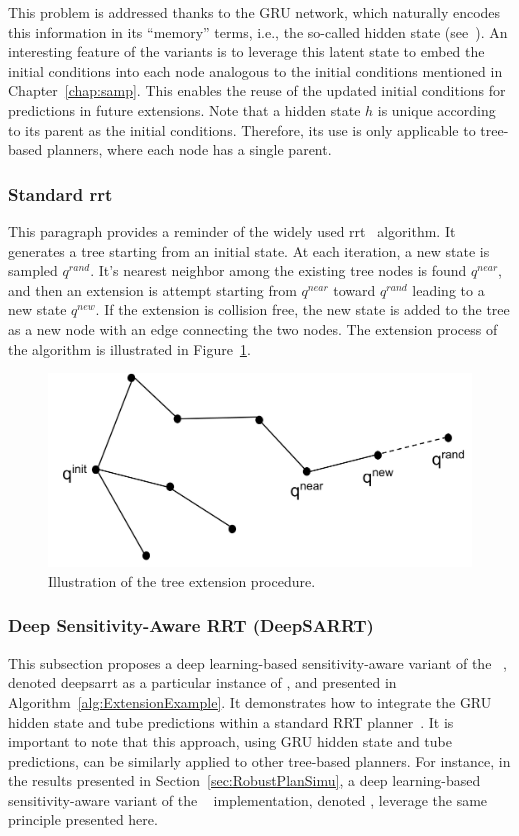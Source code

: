 This problem is addressed thanks to the GRU network, which naturally encodes this information in its ``memory'' terms, i.e., the so-called hidden state (see~\cite{cGRU}).
An interesting feature of the  variants is to leverage this latent state to embed the initial conditions into each node analogous to the  initial conditions mentioned in Chapter~\ref{chap:samp}. 
This enables the reuse of the updated initial conditions for predictions in future extensions.
Note that a hidden state $h$ is unique according to its parent as the  initial conditions.
Therefore, its use is only applicable to tree-based planners, where each node has a single parent.

\subsubsection{Standard \gls{rrt}}

This paragraph provides a reminder of the widely used \gls{rrt}~\cite{cRRT} algorithm.
It generates a tree starting from an initial state.
At each iteration, a new state is sampled $q^{rand}$.
It's nearest neighbor among the existing tree nodes is found $q^{near}$, and then an extension is attempt starting from $q^{near}$ toward $q^{rand}$ leading to a new state $q^{new}$.
If the extension is collision free, the new state is added to the tree as a new node with an edge connecting the two nodes.
The extension process of the algorithm is illustrated in Figure~\ref{fig:rrt}.

\begin{figure} [htp]
    \centering
    \includegraphics[width=0.6\linewidth]{figures/models/rrt.png} 
    \caption{Illustration of the  tree extension procedure.}%
    \label{fig:rrt}%
\end{figure}

\subsubsection{Deep Sensitivity-Aware RRT (DeepSARRT)}

This subsection proposes a deep learning-based sensitivity-aware variant of the ~\cite{cRRT}, denoted \gls{deepsarrt} as a particular instance of , and presented in Algorithm~\ref{alg:ExtensionExample}. 
It demonstrates how to integrate the GRU hidden state and tube predictions within a standard RRT planner~\cite{cRRT}.
It is important to note that this approach, using GRU hidden state and tube predictions, can be similarly applied to other tree-based planners. 
For instance, in the results presented in Section~\ref{sec:RobustPlanSimu}, a deep learning-based sensitivity-aware variant of the ~\cite{cRRTstar} implementation, denoted , leverage the same principle presented here.

